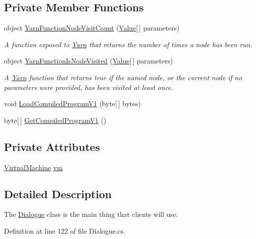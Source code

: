 \subsection*{Private Member Functions}
\begin{DoxyCompactItemize}
\item 
object \hyperlink{a00086_a10c9f22d3f55e74f091cd6069c431094}{Yarn\-Function\-Node\-Visit\-Count} (\hyperlink{a00181}{Value}\mbox{[}$\,$\mbox{]} parameters)
\begin{DoxyCompactList}\small\item\em A function exposed to \hyperlink{a00045}{Yarn} that returns the number of times a node has been run. \end{DoxyCompactList}\item 
object \hyperlink{a00086_a1ab129bd84381928531d503304ca08d6}{Yarn\-Function\-Is\-Node\-Visited} (\hyperlink{a00181}{Value}\mbox{[}$\,$\mbox{]} parameters)
\begin{DoxyCompactList}\small\item\em A \hyperlink{a00045}{Yarn} function that returns true if the named node, or the current node if no parameters were provided, has been visited at least once. \end{DoxyCompactList}\item 
void \hyperlink{a00086_a706df08e842c2419f7a66fd40c0a544f}{Load\-Compiled\-Program\-V1} (byte\mbox{[}$\,$\mbox{]} bytes)
\item 
byte\mbox{[}$\,$\mbox{]} \hyperlink{a00086_a070898dbc07fd7d0a74d7c3ac1848beb}{Get\-Compiled\-Program\-V1} ()
\end{DoxyCompactItemize}
\subsection*{Private Attributes}
\begin{DoxyCompactItemize}
\item 
\hyperlink{a00156}{Virtual\-Machine} \hyperlink{a00086_a8c1319357a9df6cff051328fb33224c7}{vm}
\end{DoxyCompactItemize}


\subsection{Detailed Description}
The \hyperlink{a00086}{Dialogue} class is the main thing that clients will use. 

Definition at line 122 of file Dialogue.\-cs.



